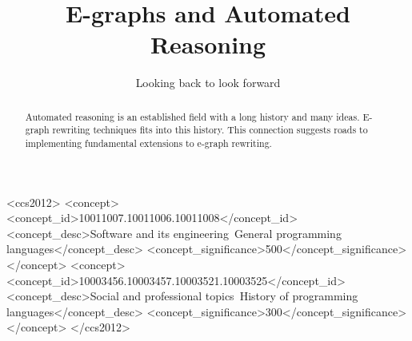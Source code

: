 \documentclass[sigplan,10pt,review,anonymous]{acmart}
\begin{document}
\title[Short Title]{E-graphs and Automated Reasoning}         %
\subtitle{Looking back to look forward}                     %







\begin{abstract}
  Automated reasoning \cite{DAVIS20013} is an established field with a long history and many ideas.
  E-graph rewriting techniques fits into this history. This connection suggests roads to implementing fundamental extensions to e-graph rewriting.
\end{abstract}


\begin{CCSXML}
<ccs2012>
<concept>
<concept_id>10011007.10011006.10011008</concept_id>
<concept_desc>Software and its engineering~General programming languages</concept_desc>
<concept_significance>500</concept_significance>
</concept>
<concept>
<concept_id>10003456.10003457.10003521.10003525</concept_id>
<concept_desc>Social and professional topics~History of programming languages</concept_desc>
<concept_significance>300</concept_significance>
</concept>
</ccs2012>
\end{CCSXML}
\end{document}
